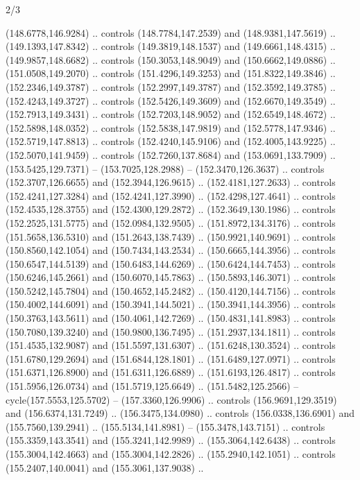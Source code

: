 \begin{flagdescription}{2/3}
\begin{scope}[shift={(0.5\flaglength,0.5)},scale=\flagwidth/320]
\begin{scope}[y=0.8pt, x=0.8pt, yscale=-1,shift={(-118.3,-146)}]
  (148.6778,146.9284) .. controls (148.7784,147.2539) and (148.9381,147.5619) ..
  (149.1393,147.8342) .. controls (149.3819,148.1537) and (149.6661,148.4315) ..
  (149.9857,148.6682) .. controls (150.3053,148.9049) and (150.6662,149.0886) ..
  (151.0508,149.2070) .. controls (151.4296,149.3253) and (151.8322,149.3846) ..
  (152.2346,149.3787) .. controls (152.2997,149.3787) and (152.3592,149.3785) ..
  (152.4243,149.3727) .. controls (152.5426,149.3609) and (152.6670,149.3549) ..
  (152.7913,149.3431) .. controls (152.7203,148.9052) and (152.6549,148.4672) ..
  (152.5898,148.0352) .. controls (152.5838,147.9819) and (152.5778,147.9346) ..
  (152.5719,147.8813) .. controls (152.4240,145.9106) and (152.4005,143.9225) ..
  (152.5070,141.9459) .. controls (152.7260,137.8684) and (153.0691,133.7909) ..
  (153.5425,129.7371) -- (153.7025,128.2988) -- (152.3470,126.3637) .. controls
  (152.3707,126.6655) and (152.3944,126.9615) .. (152.4181,127.2633) .. controls
  (152.4241,127.3284) and (152.4241,127.3990) .. (152.4298,127.4641) .. controls
  (152.4535,128.3755) and (152.4300,129.2872) .. (152.3649,130.1986) .. controls
  (152.2525,131.5775) and (152.0984,132.9505) .. (151.8972,134.3176) .. controls
  (151.5658,136.5310) and (151.2643,138.7439) .. (150.9921,140.9691) .. controls
  (150.8560,142.1054) and (150.7434,143.2534) .. (150.6665,144.3956) .. controls
  (150.6547,144.5139) and (150.6483,144.6269) .. (150.6424,144.7453) .. controls
  (150.6246,145.2661) and (150.6070,145.7863) .. (150.5893,146.3071) .. controls
  (150.5242,145.7804) and (150.4652,145.2482) .. (150.4120,144.7156) .. controls
  (150.4002,144.6091) and (150.3941,144.5021) .. (150.3941,144.3956) .. controls
  (150.3763,143.5611) and (150.4061,142.7269) .. (150.4831,141.8983) .. controls
  (150.7080,139.3240) and (150.9800,136.7495) .. (151.2937,134.1811) .. controls
  (151.4535,132.9087) and (151.5597,131.6307) .. (151.6248,130.3524) .. controls
  (151.6780,129.2694) and (151.6844,128.1801) .. (151.6489,127.0971) .. controls
  (151.6371,126.8900) and (151.6311,126.6889) .. (151.6193,126.4817) .. controls
  (151.5956,126.0734) and (151.5719,125.6649) .. (151.5482,125.2566) --
  cycle(157.5553,125.5702) -- (157.3360,126.9906) .. controls
  (156.9691,129.3519) and (156.6374,131.7249) .. (156.3475,134.0980) .. controls
  (156.0338,136.6901) and (155.7560,139.2941) .. (155.5134,141.8981) --
  (155.3478,143.7151) .. controls (155.3359,143.3541) and (155.3241,142.9989) ..
  (155.3064,142.6438) .. controls (155.3004,142.4663) and (155.3004,142.2826) ..
  (155.2940,142.1051) .. controls (155.2407,140.0041) and (155.3061,137.9038) ..

\end{scope}
\end{scope}
\end{flagdescription}
